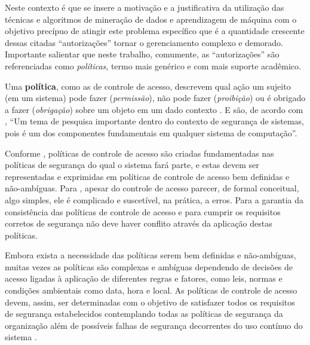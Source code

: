 \documentclass[
	12pt,				%
	openright,			%
	oneside,			%
	a4paper,			%
	english,			%
	french,				%
	spanish,			%
	brazil				%
	]{abntex2}
\begin{document}
Neste contexto é que se insere a motivação e a justificativa da utilização das técnicas e algoritmos de mineração de dados e aprendizagem de máquina com o objetivo precípuo de atingir este problema específico que é a quantidade crescente dessas citadas ``autorizações'' tornar o gerenciamento complexo e demorado. Importante salientar que neste trabalho, comumente, as ``autorizações'' são referenciadas como \textit{políticas}, termo mais genérico e com mais suporte acadêmico. 

Uma \textbf{política}, como as de controle de acesso, descrevem qual ação um sujeito (em um sistema) pode fazer (\textit{permissão}), não pode fazer (\textit{proibição}) ou é obrigado a fazer (\textit{obrigação}) sobre um objeto em um dado contexto \cite{sarkis2017}. E são, de acordo com , ``Um tema de pesquisa importante dentro do contexto de segurança de sistemas, pois é um dos componentes fundamentais em qualquer sistema de computação''.



Conforme , políticas de controle de acesso são criadas fundamentadas nas políticas de segurança do qual o sistema fará parte, e estas devem ser representadas e exprimidas em políticas de controle de acesso bem definidas e não-ambíguas. Para , apesar do controle de acesso parecer, de formal conceitual, algo simples, ele é complicado e suscetível, na prática, a erros. Para a garantia da consistência das políticas de controle de acesso e para cumprir os requisitos corretos de segurança não deve haver conflito através da aplicação destas políticas.

Embora exista a necessidade das políticas serem bem definidas e não-ambíguas, muitas vezes as políticas são complexas e ambíguas dependendo de decisões de acesso ligadas à aplicação de diferentes regras e fatores, como leis, normas e condições ambientais como data, hora e local. As políticas de controle de acesso devem, assim, ser determinadas com o objetivo de satisfazer todos os requisitos de segurança estabelecidos contemplando todas as políticas de segurança da organização além de possíveis falhas de segurança decorrentes do uso contínuo do sistema \cite{silva_uma_2018, sandhu_access_1994}.
\end{document}
